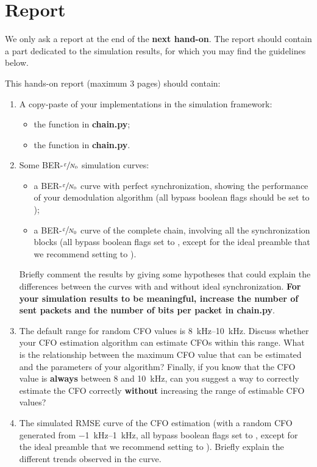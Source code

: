 \section{Report}

We only ask a report at the end of the \textbf{next hand-on}. The report should contain a part dedicated to the simulation results, for which you may find the guidelines below.

This hands-on report (maximum 3 pages) should contain:
\begin{enumerate}
    \item A copy-paste of your implementations in the simulation framework:
    \begin{itemize}
        \item the  function in \textbf{chain.py};
        \item the  function in \textbf{chain.py}.
    \end{itemize}
    \item Some BER-$\sfrac{\varepsilon}{N_0}$ simulation curves:
    \begin{itemize}
        \item a BER-$\sfrac{\varepsilon}{N_0}$ curve with perfect synchronization, showing the performance of your demodulation algorithm (all bypass boolean flags should be set to );
        \item a BER-$\sfrac{\varepsilon}{N_0}$ curve of the complete chain, involving all the synchronization blocks (all bypass boolean flags set to , except for the ideal preamble that we recommend setting to ).
    \end{itemize}
    Briefly comment the results by giving some hypotheses that could explain the differences between the curves with and without ideal synchronization. \textbf{For your simulation results to be meaningful, increase the number of sent packets and the number of bits per packet in \textbf{chain.py}}.
    \item The default range for random CFO values is \SIrange{8}{10}{\kilo\hertz}. Discuss whether your CFO estimation algorithm can estimate CFOs within this range. What is the relationship between the maximum CFO value that can be estimated and the parameters of your algorithm? Finally, if you know that the CFO value is \textbf{always} between 8 and \SI{10}{\kilo\hertz}, can you suggest a way to correctly estimate the CFO correctly \textbf{without} increasing the range of estimable CFO values?
    \item The simulated RMSE curve of the CFO estimation (with a random CFO generated from \SIrange{-1}{1}{\kilo\hertz}, all bypass boolean flags set to , except for the ideal preamble that we recommend setting to ). Briefly explain the different trends observed in the curve.
\end{enumerate}

